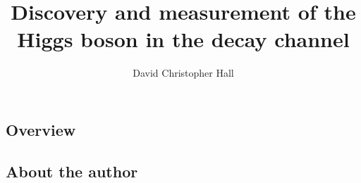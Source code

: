 \documentclass[hyper,allcolors=blue]{mythesis}  %
\title{Discovery and measurement of the Higgs boson in the \WW decay channel}
\author{David Christopher Hall}
\begin{document}
\begin{frontmatter}
  
\end{frontmatter}

\begin{mainmatter}
  \clearpage
  
  \chapter*{Overview}
    \label{chap:intro}
    

  
  
  
  
  
  
  
  
  
  
\end{mainmatter}

\begin{onehalfspacing}
  \cleardoublepage
  \section*{About the author}
  \thispagestyle{plain}
  
\end{onehalfspacing}
\end{document}
